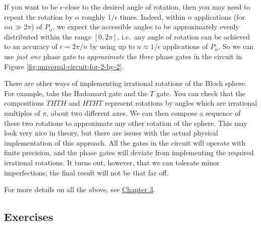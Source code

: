 \documentclass[fleqn]{article}
\begin{document}
If you want to be \(\epsilon\)-close to the desired angle of rotation, then you may need to repeat the rotation by \(\alpha\) roughly \(1/\epsilon\) times.
Indeed, within \(n\) applications (for \(n\alpha\gg 2\pi\)) of \(P_\alpha\), we expect the accessible angles to be approximately evenly distributed within the range \([0,2\pi]\), i.e.~any angle of rotation can be achieved to an accuracy of \(\epsilon=2\pi/n\) by using up to \(n\approx 1/\epsilon\) applications of \(P_\alpha\).
So we can use \emph{just one} phase gate to \emph{approximate} the \emph{three} phase gates in the circuit in Figure \ref{fig:universal-circuit-for-2-by-2}.

There are other ways of implementing irrational rotations of the Bloch sphere.
For example, take the Hadamard gate and the \(T\) gate.
You can check that the compositions \(THTH\) and \(HTHT\) represent rotations by angles which are irrational multiples of \(\pi\), about two different axes.
We can then compose a sequence of these two rotations to approximate any other rotation of the sphere.
This may look very nice in theory, but there are issues with the actual physical implementation of this approach.
All the gates in the circuit will operate with finite precision, and the phase gates will deviate from implementing the required irrational rotations.
It turns out, however, that we can tolerate minor imperfections; the final result will not be that far off.

For more details on all the above, see \protect\hyperlink{chapter3}{Chapter 3}.

\hypertarget{exercises}{%
\subsection{Exercises}\label{exercises}}
\end{document}
